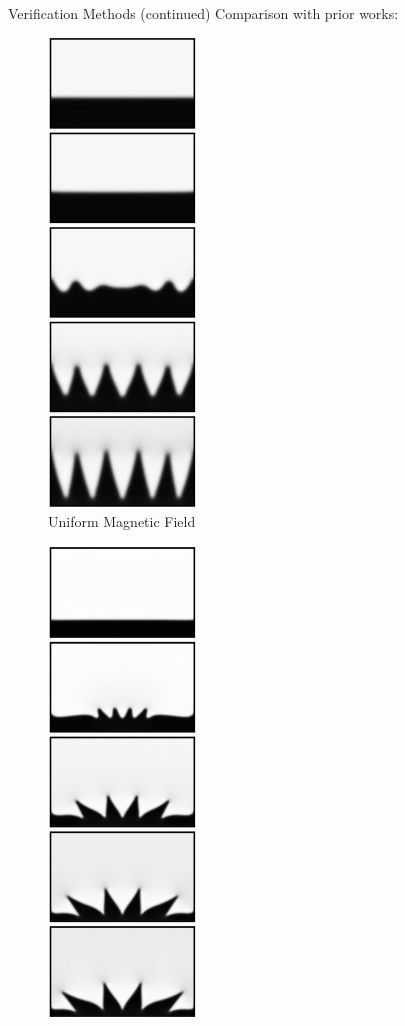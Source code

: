 \documentclass[9pt]{beamer}
\begin{document}
\begin{frame}{Verification Methods (continued)}
	Comparison with prior works:
	\begin{minipage}{.3\paperwidth}
		\begin{figure}[!b]
			\centering
			\includegraphics[scale=.56]{Instab.jpg}
			\caption*{Uniform Magnetic Field}
		\end{figure}
	\end{minipage}%
	\begin{minipage}{.3\paperwidth}
		\begin{figure}[!b]
			\centering
			\includegraphics[scale=.56]{Hedgehog.jpg}

\end{figure}
\end{minipage}
\end{frame}
\end{document}
